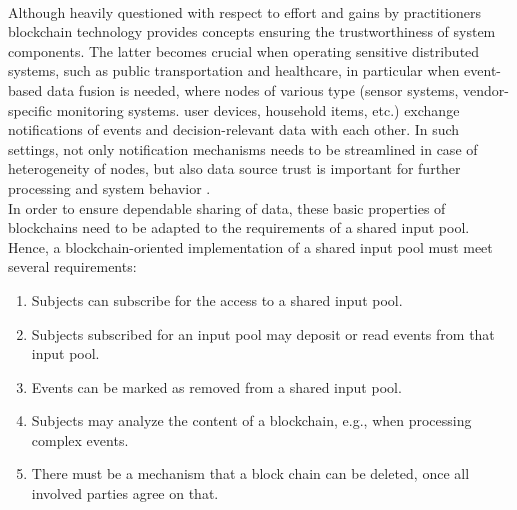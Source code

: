 \\
Although heavily questioned with respect to effort and gains by practitioners \cite{article:BlockchainUniverse} blockchain technology provides concepts ensuring the trustworthiness of system components. The latter becomes crucial when operating sensitive distributed systems, such as public transportation and healthcare, in particular when event-based data fusion is needed, where nodes of various type (sensor systems, vendor-specific monitoring systems. user devices, household items, etc.) exchange notifications of events and decision-relevant data with each other. In such settings, not only notification mechanisms needs to be streamlined in case of heterogeneity of nodes, but also data source trust is important for further processing and system behavior \cite{article:EventbasedSensor}.
\\
In order to ensure dependable sharing of data, these basic properties of blockchains need to be adapted to the requirements of a shared input pool. Hence, a blockchain-oriented implementation of a shared input pool must meet several requirements:
\begin{enumerate}
	\item Subjects can subscribe for the access to a shared input pool.
	\item Subjects subscribed for an input pool may deposit or read events from that input pool.
	\item Events can be marked as removed from a shared input pool.
	\item Subjects may analyze the content of a blockchain, e.g., when processing complex events.
	\item There must be a mechanism that a block chain can be deleted, once all involved parties agree on that.
\end{enumerate}

